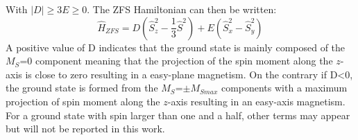 \documentclass[10pt]{report}
\numberwithin{equation}{section}
\begin{document}
With $|D| \geq 3E \geq 0$. 
The ZFS Hamiltonian can then be written:
\begin{equation}  %
    \hat{H}_{ZFS}=D (\hat{S}_z^2-\frac{1}{3}\hat{S}^2)+E(\hat{S}_x^2-\hat{S}_y^2)
\end{equation}
A positive value of D indicates that the ground state is mainly composed of the $M_S$=0 component meaning that the projection of the spin moment along the $z$-axis is close to zero resulting in a easy-plane magnetism. 
On the contrary if D<0, the ground state is formed from the $M_S$=$\pm M_{Smax}$ components with a maximum projection of spin moment along the $z$-axis resulting in an easy-axis magnetism.
For a ground state with spin larger than one and a half, other terms may appear but will not be reported in this work. %
\end{document}
